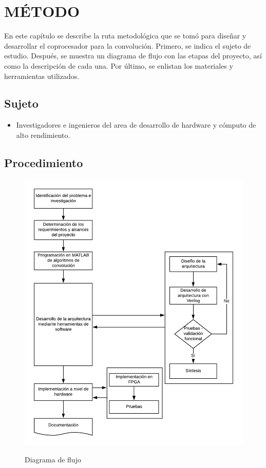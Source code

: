 \renewcommand\thechapter{\Roman{chapter}}
\chapter{MÉTODO} \label{ch:metodo} \thispagestyle{fancy}
\renewcommand\thechapter{\arabic{chapter}}
En este capítulo se describe la ruta metodológica que se tomó para diseñar y desarrollar el coprocesador para la convolución. Primero, se indica el sujeto de estudio. Después, se muestra un diagrama de flujo con las etapas del proyecto, así como la descripción de cada una. Por último, se enlistan los materiales y herramientas utilizados.


\section{Sujeto}
\begin{itemize}
\item Investigadores e ingenieros del area de desarrollo de hardware y cómputo de alto rendimiento. 
\end{itemize}

\section{Procedimiento}

\begin{figure}[!h]
\centering
\includegraphics[width=1\textwidth, height=1\textheight]{./figs/procedimiento}\\
\caption{Diagrama de flujo}
\label{diagramaflujo}
\end{figure}

